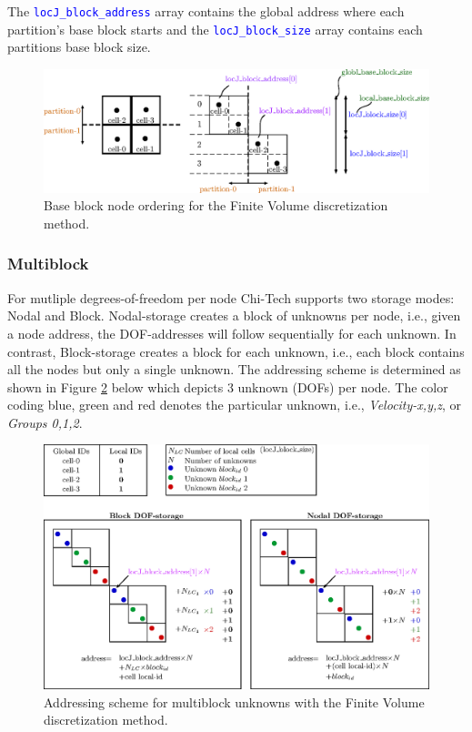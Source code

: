 \documentclass[11pt,letterpaper,titlepage]{article}
\newcommand{\xmltag}[1]{\textcolor{blue}{ \texttt{#1}} }
\numberwithin{equation}{section}
\begin{document}
The \xmltag{locJ\_block\_address} array contains the global address where each partition's base block starts and the \xmltag{locJ\_block\_size} array contains each partitions base block size.

\begin{figure}[H]
\centering
\includegraphics[width=0.9\linewidth]{Figures/DiscretizationBaseBlockFV.eps}
\caption{Base block node ordering for the Finite Volume discretization method.}
\label{fig:discretizationbaseblockfv}
\end{figure}

\subsubsection{Multiblock}
For mutliple degrees-of-freedom per node Chi-Tech supports two storage modes: Nodal and Block. Nodal-storage creates a block of unknowns per node, i.e., given a node address, the DOF-addresses will follow sequentially for each unknown. In contrast, Block-storage creates a block for each unknown, i.e., each block contains all the nodes but only a single unknown. The addressing scheme is determined as shown in Figure \ref{fig:discretizationcomponentblockfv} below which depicts 3 unknown (DOFs) per node. The color coding blue, green and red denotes the particular unknown, i.e., \textit{Velocity-x,y,z}, or \textit{Groups 0,1,2}.

\begin{figure}[H]
\centering
\includegraphics[width=1.0\linewidth]{Figures/DiscretizationComponentBlockFV}
\caption{Addressing scheme for multiblock unknowns with the Finite Volume discretization method.}
\label{fig:discretizationcomponentblockfv}
\end{figure}
\end{document}
